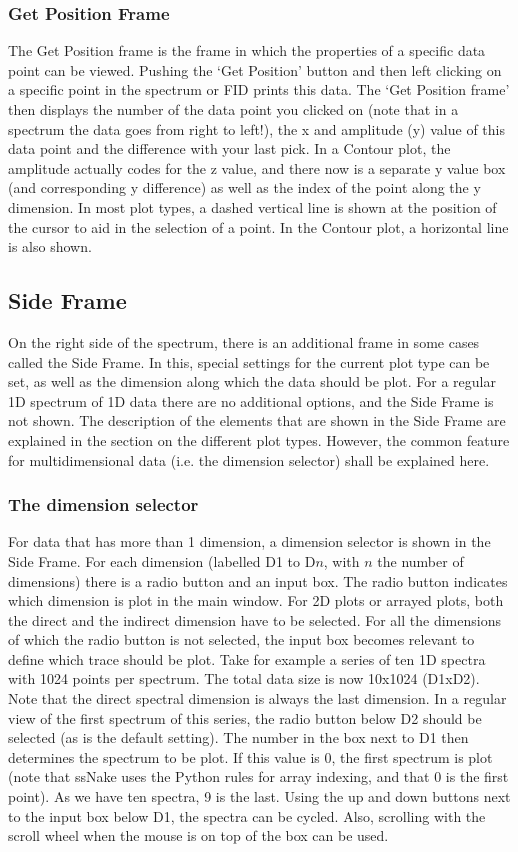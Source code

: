 \documentclass[11pt,a4paper]{article}
\begin{document}
\subsubsection*{Get Position Frame}
The Get Position frame is the frame in which the properties of a specific data point can be viewed. Pushing the `Get Position'  button and then left clicking on a specific point in the spectrum or FID prints this data. The `Get Position frame' then displays the number of the data point you clicked on (note that in a spectrum the data goes from right to left!), the x and amplitude (y) value of this data point and the difference with your last pick. In a Contour plot, the amplitude actually codes for the z value, and there now is a separate y value box (and corresponding y difference) as well as the index of the point along the y dimension. In most plot types, a dashed vertical line is shown at the position of the cursor to aid in the selection of a point. In the Contour plot, a horizontal line is also shown.

\subsection{Side Frame}
On the right side of the spectrum, there is an additional frame in some cases called the Side Frame. In this, special settings for the current plot type can be set, as well as the dimension along which the data should be plot. For a regular 1D spectrum of 1D data there are no additional options, and the Side Frame is not shown. The description of the elements that are shown in the Side Frame are explained in the section on the different plot types. However, the common feature for multidimensional data (i.e. the dimension selector) shall be explained here.

\subsubsection*{The dimension selector}
For data that has more than 1 dimension, a dimension selector is shown in the Side Frame. For each dimension (labelled D1 to D$n$, with $n$ the number of dimensions) there is a radio button and an input box. The radio button indicates which dimension is plot in the main window. For 2D plots or arrayed plots, both the direct and the indirect dimension have to be selected. For all the dimensions of which the radio button is not selected, the input box becomes relevant to define which trace should be plot. Take for example a series of ten 1D spectra with 1024 points per spectrum. The total data size is now 10x1024 (D1xD2). Note that the direct spectral dimension is always the last dimension. In a regular view of the first spectrum of this series, the radio button below D2 should be selected (as is the default setting). The number in the box next to D1 then determines the spectrum to be plot. If this value is 0, the first spectrum is plot (note that ssNake uses the Python rules for array indexing, and that 0 is the first point). As we have ten spectra, 9 is the last. Using the up and down buttons next to the input box below D1, the spectra can be cycled. Also, scrolling with the scroll wheel when the mouse is on top of the box can be used. 
\end{document}

